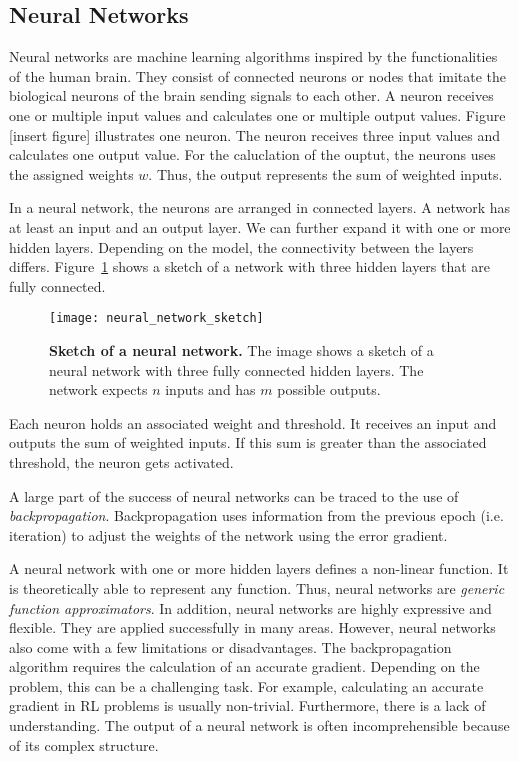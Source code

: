\subsection{Neural Networks}
Neural networks are machine learning algorithms inspired by the functionalities of the human brain. They consist of connected neurons or nodes that imitate the biological neurons of the brain sending signals to each other. A neuron receives one or multiple input values and calculates one or multiple output values. Figure [insert figure] illustrates one neuron. The neuron receives three input values and calculates one output value. For the caluclation of the ouptut, the neurons uses the assigned weights $w$. Thus, the output represents the sum of weighted inputs.

In a neural network, the neurons are arranged in connected layers. A network has at least an input and an output layer. We can further expand it with one or more hidden layers. Depending on the model, the connectivity between the layers differs. Figure~\ref{fig:neural_network_sketch} shows a sketch of a network with three hidden layers that are fully connected.
\begin{figure}[ht]
\centering
\texttt{[image: neural\_network\_sketch]}
\caption[Sketch of a Neural Network]{
  \textbf{Sketch of a neural network.}
  The image shows a sketch of a neural network with three fully connected hidden layers. The network expects $n$ inputs and has $m$ possible outputs.
}
\label{fig:neural_network_sketch}
\end{figure}
Each neuron holds an associated weight and threshold. It receives an input and outputs the sum of weighted inputs. If this sum is greater than the associated threshold, the neuron gets activated.

A large part of the success of neural networks can be traced to the use of \textit{backpropagation}. Backpropagation uses information from the previous epoch (i.e. iteration) to adjust the weights of the network using the error gradient.

A neural network with one or more hidden layers defines a non-linear function. It is theoretically able to represent any function. Thus, neural networks are \textit{generic function approximators}. In addition, neural networks are highly expressive and flexible. They are applied successfully in many areas. However, neural networks also come with a few limitations or disadvantages. The backpropagation algorithm requires the calculation of an accurate gradient. Depending on the problem, this can be a challenging task. For example, calculating an accurate gradient in RL problems is usually non-trivial. Furthermore, there is a lack of understanding. The output of a neural network is often incomprehensible because of its complex structure.

